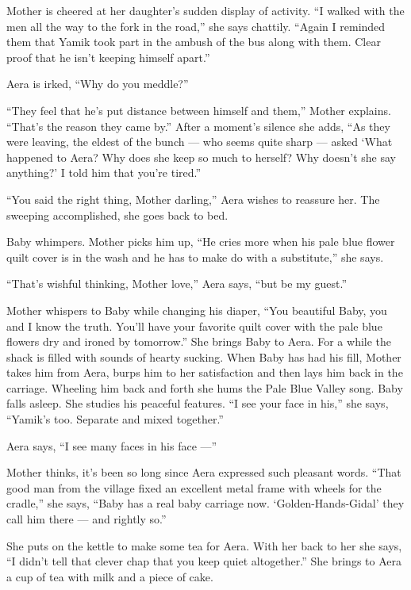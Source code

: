 \documentclass[twoside,11pt,openany]{book}
\begin{document}
Mother is cheered at her daughter's sudden display of activity. ``I walked with the men all the way to the
fork in the road,'' she says chattily. ``Again I reminded them that Yamik took part in the
ambush of the bus along with them.  Clear proof that he isn't keeping himself apart.''

Aera is irked, ``Why do you meddle?''

``They feel that he's put distance between himself and them,'' Mother explains.
``That's the reason they came by.'' After a moment's silence she adds, ``As they
were leaving, the eldest of the bunch --- who seems quite sharp --- asked `What happened to Aera? Why does she keep so much
to herself? Why doesn't she say anything?' I told him that you're tired.''

``You said the right thing, Mother darling,'' Aera wishes to reassure her. The sweeping
accomplished, she goes back to bed.

Baby whimpers. Mother picks him up, ``He cries more when his pale blue flower quilt cover is in the wash
and he has to make do with a substitute,'' she says.

``That's wishful thinking, Mother love,'' Aera says, ``but be my
guest.''

Mother whispers to Baby while changing his diaper, ``You beautiful Baby, you and I know the truth. You'll
have your favorite quilt cover with the pale blue flowers dry and ironed by tomorrow.'' She brings Baby
to Aera. For a while the shack is filled with sounds of hearty sucking. When Baby has had his fill, Mother takes him
from Aera, burps him to her satisfaction and then lays him back in the carriage. Wheeling him back and forth she hums
the Pale Blue Valley song. Baby falls asleep. She studies his peaceful features. ``I see your face in
his,{}'' she says, ``Yamik's too. Separate and mixed together.''

Aera says, ``I see many faces in his face ---''

Mother thinks, it's been so long since Aera expressed such pleasant words. ``That good
man from the village fixed an excellent metal frame with wheels for the cradle,'' she says,
``Baby has a real baby carriage now. `Golden-Hands-Gidal' they call him there --- and rightly
so.''

She puts on the kettle to make some tea for Aera. With her back to her she says, ``I didn't tell that
clever chap that you keep quiet altogether.'' She brings  to Aera a cup of tea with milk and a piece of
cake.
\end{document}
